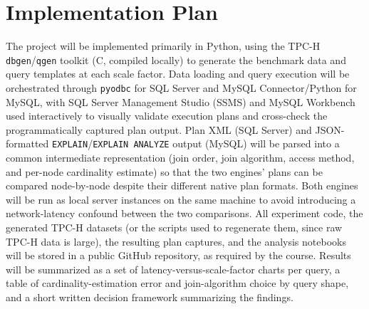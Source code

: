 \documentclass[conference]{IEEEtran}
\begin{document}
\section{Implementation Plan}
The project will be implemented primarily in Python, using the TPC-H \texttt{dbgen}/\texttt{qgen} toolkit (C, compiled locally) to generate the benchmark data and query templates at each scale factor. Data loading and query execution will be orchestrated through \texttt{pyodbc} for SQL Server and MySQL Connector/Python for MySQL, with SQL Server Management Studio (SSMS) and MySQL Workbench used interactively to visually validate execution plans and cross-check the programmatically captured plan output. Plan XML (SQL Server) and JSON-formatted \texttt{EXPLAIN}/\texttt{EXPLAIN ANALYZE} output (MySQL) will be parsed into a common intermediate representation (join order, join algorithm, access method, and per-node cardinality estimate) so that the two engines' plans can be compared node-by-node despite their different native plan formats. Both engines will be run as local server instances on the same machine to avoid introducing a network-latency confound between the two comparisons. All experiment code, the generated TPC-H datasets (or the scripts used to regenerate them, since raw TPC-H data is large), the resulting plan captures, and the analysis notebooks will be stored in a public GitHub repository, as required by the course. Results will be summarized as a set of latency-versus-scale-factor charts per query, a table of cardinality-estimation error and join-algorithm choice by query shape, and a short written decision framework summarizing the findings.
\end{document}
